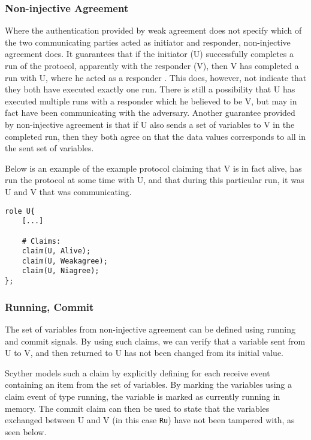 \subsubsection{Non-injective Agreement}

Where the authentication provided by weak agreement does not specify which of the two communicating parties acted as initiator and responder, non-injective agreement does. It guarantees that if the initiator (U) successfully completes a run of the protocol, apparently with the responder (V), then V has completed a run with U, where he acted as a responder \cite{lowe1997hierarchy}. This does, however, not indicate that they both have executed exactly one run. There is still a possibility that U has executed multiple runs with a responder which he believed to be V, but may in fact have been communicating with the adversary. Another guarantee provided by non-injective agreement is that if U also sends a set of variables to V in the completed run, then they both agree on that the data values corresponds to all in the sent set of variables.


Below is an example of the example protocol claiming that V is in fact alive, has run the protocol at some time with U, and that during this particular run, it was U and V that was communicating.\newline

\begin{lstlisting}
role U{
	[...]
	
	# Claims:
	claim(U, Alive);
	claim(U, Weakagree);
	claim(U, Niagree);
};
\end{lstlisting} 





\subsubsection{Running, Commit}

The set of variables from non-injective agreement can be defined using running and commit signals. By using such claims, we can verify that a variable sent from U to V, and then returned to U has not been changed from its initial value.

Scyther models such a claim by explicitly defining for each receive event containing an item from the set of variables. By marking the variables using a claim event of type running, the variable is marked as currently running in memory. The commit claim can then be used to state that the variables exchanged between U and V (in this case \texttt{Ru}) have not been tampered with, as seen below.\newline

